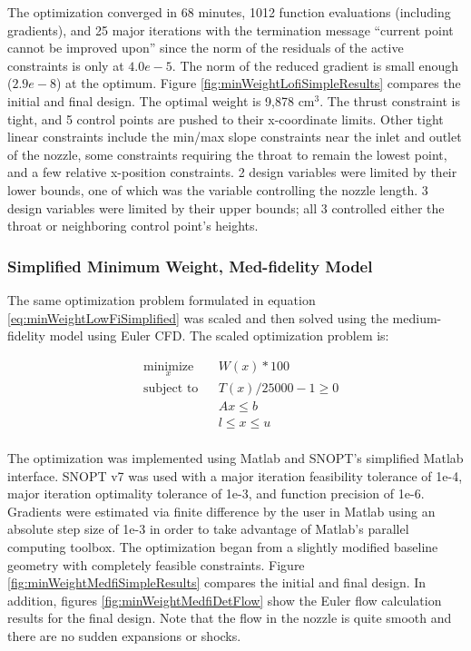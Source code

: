 \documentclass{article}
\begin{document}
The optimization converged in 68 minutes, 1012 function evaluations (including gradients), and 25 major iterations with the termination message ``current point cannot be improved upon'' since the norm of the residuals of the active constraints is only at $4.0e-5$. The norm of the reduced gradient is small enough ($2.9e-8$) at the optimum. Figure \ref{fig:minWeightLofiSimpleResults} compares the initial and final design. The optimal weight is 9,878 $\textrm{cm}^3$. The thrust constraint is tight, and 5 control points are pushed to their x-coordinate limits. Other tight linear constraints include the min/max slope constraints near the inlet and outlet of the nozzle, some constraints requiring the throat to remain the lowest point, and a few relative x-position constraints. 2 design variables were limited by their lower bounds, one of which was the variable controlling the nozzle length. 3 design variables were limited by their upper bounds; all 3 controlled either the throat or neighboring control point's heights.

\subsubsection{Simplified Minimum Weight, Med-fidelity Model}

The same optimization problem formulated in equation \ref{eq:minWeightLowFiSimplified} was scaled and then solved using the medium-fidelity model using Euler CFD. The scaled optimization problem is:

\begin{equation}
\label{eq:minWeightMedFiScaled}
\begin{aligned}
& \underset{x}{\text{minimize}}
& & W(x)*100 \\
& \text{subject to}
& & T(x)/25000 - 1 \geq 0 \\
& & & A x \leq b \\
& & & l \leq x \leq u \\
\end{aligned}
\end{equation}

The optimization was implemented using Matlab and SNOPT's simplified Matlab interface. SNOPT v7 was used with a major iteration feasibility tolerance of 1e-4, major iteration optimality tolerance of 1e-3, and function precision of 1e-6. Gradients were estimated via finite difference by the user in Matlab using an absolute step size of 1e-3 in order to take advantage of Matlab's parallel computing toolbox. The optimization began from a slightly modified baseline geometry with completely feasible constraints. Figure \ref{fig:minWeightMedfiSimpleResults} compares the initial and final design. In addition, figures \ref{fig:minWeightMedfiDetFlow} show the Euler flow calculation results for the final design. Note that the flow in the nozzle is quite smooth and there are no sudden expansions or shocks.
\end{document}
